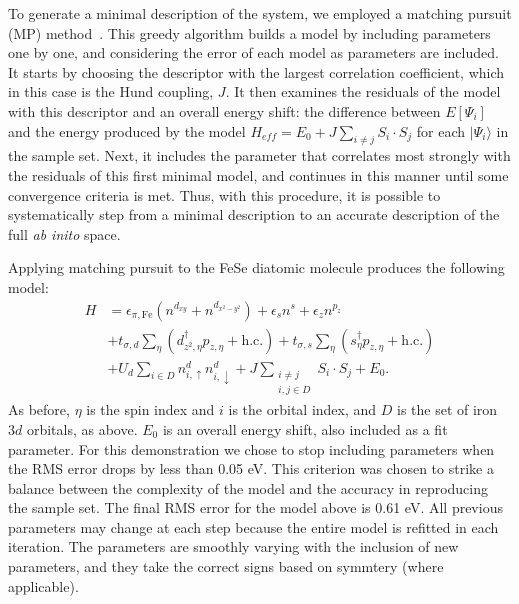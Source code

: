 To generate a minimal description of the system, we employed a matching pursuit (MP) method~\cite{MP_Zhang1993}.
This greedy algorithm builds a model by including parameters one by one, and considering the error of each model as parameters are included.
It starts by choosing the descriptor with the largest correlation coefficient, which in this case is the Hund coupling, $J$.
It then examines the residuals of the model with this descriptor and an overall energy shift: the difference between $E[\Psi_i]$ and the energy produced by the model $H_{eff} = E_0 + J \sum_{i\ne j}S_i \cdot S_j$ for each $|\Psi_i\rangle$ in the sample set.
Next, it includes the parameter that correlates most strongly with the residuals of this first minimal model, and continues in this manner until some convergence criteria is met.
Thus, with this procedure, it is possible to systematically step from a minimal description to an accurate description of the full \textit{ab inito} space.

Applying matching pursuit to the FeSe diatomic molecule produces the following model:
\begin{align}
  H 
  &=
  \epsilon_{\pi,\mathrm{Fe}} (n^{d_{xy}} + n^{d_{x^2-y^2}})
  +
  \epsilon_s n^{s}
  +
  \epsilon_{z} n^{p_z}
  \nonumber \\
  &+ 
  t_{\sigma,d} \sum_{\eta} \left( d_{z^2,\eta}^{\dagger} p_{z,\eta} + \text{h.c.} \right)
  +
  t_{\sigma,s} \sum_{\eta} \left(s_{\eta}^{\dagger}  p_{z,\eta} + \text{h.c.} \right)
  \nonumber \\
  &+
  U_d \sum_{i \in D} n^{d}_{i,\uparrow} n^{d}_{i,\downarrow} 
  +
  J \sum_{\substack{i\ne j \\i,j \in D}} S_i \cdot S_j
  +
  E_0. \label{eq:fesemodel}
\end{align}
As before, $\eta$ is the spin index and $i$ is the orbital index, and $D$ is the set of iron $3d$ orbitals, as above.
$E_0$ is an overall energy shift, also included as a fit parameter.
For this demonstration we chose to stop including parameters when the RMS error drops by less than 0.05 eV.
This criterion was chosen to strike a balance between the complexity of the model and the accuracy in reproducing the sample set.
The final RMS error for the model above is 0.61 eV.
All previous parameters may change at each step because the entire model is refitted in each iteration.
The parameters are smoothly varying with the inclusion of new parameters, and they take the correct signs based on symmtery (where applicable). 

